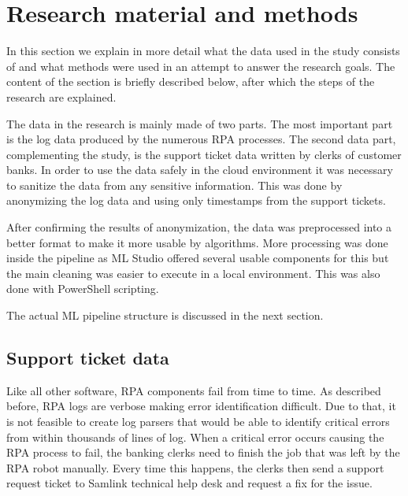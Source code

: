 

\section{Research material and methods}\label{sec:research-material-and-methods}

In this section
we explain in more detail
what the data used in the study
consists of
and what methods were used
in an attempt to answer the research goals.
The content of the section is briefly described below,
after which the steps of the research are explained.

The data in the research is mainly made of two parts.
The most important part is
the log data produced by the numerous RPA processes.
The second data part,
complementing the study,
is the support ticket data written by clerks of customer banks.
In order to use the data safely in the cloud environment
it was necessary to sanitize the data
from any sensitive information.
This was done by anonymizing the log data
and using only timestamps from the support tickets.

After confirming the results of anonymization,
the data was preprocessed into a better format
to make it more usable by algorithms.
More processing was done inside the pipeline
as ML Studio offered several usable components for this
but the main cleaning was easier to execute in a local environment.
This was also done with PowerShell scripting.

The actual ML pipeline structure
is discussed in the next section.


\subsection{Support ticket data}\label{subsec:meth-efecte-ticket-data}

Like all other software,
RPA components fail from time to time.
As described before,
RPA logs are verbose
making error identification difficult.
Due to that,
it is not feasible to create log parsers
that would be able to identify critical errors
from within thousands of lines of log.
When a critical error occurs
causing the RPA process to fail,
the banking clerks need to finish the job that
was left by the RPA robot manually.
Every time this happens,
the clerks then send a support request ticket
to Samlink technical help desk
and request a fix for the issue.

